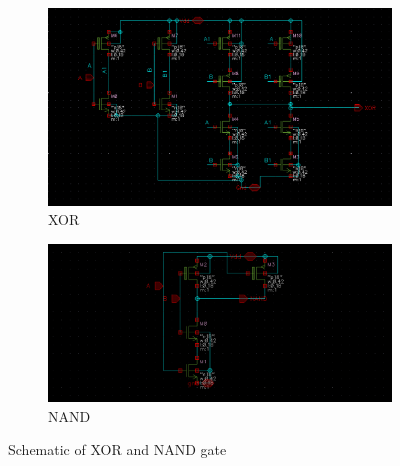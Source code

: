 \begin{figure}[h]
\begin{center}
\begin{subfigure}{0.4\textwidth}
\includegraphics[width=\textwidth]{chapters/chapter04/simple_xor_gate.png}
\caption{ XOR }
\end{subfigure}
\begin{subfigure}{0.4\textwidth}
\includegraphics[width=\textwidth]{chapters/chapter04/nand_gate.png}
\caption{ NAND }
\end{subfigure}
\end{center}
\caption{Schematic of XOR and NAND gate }

\end{figure}


